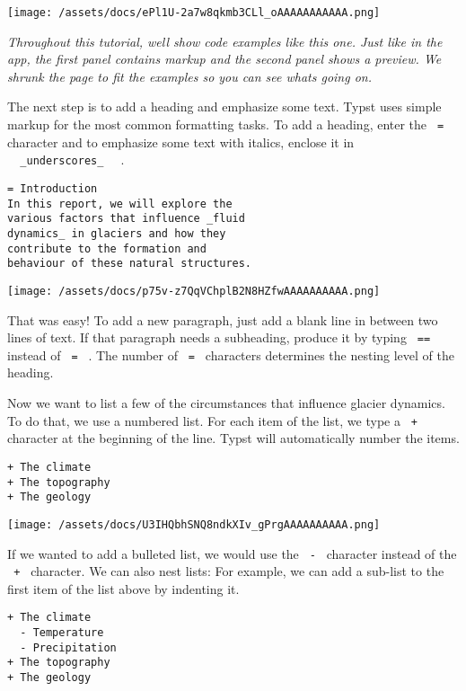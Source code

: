 \texttt{[image: /assets/docs/ePl1U-2a7w8qkmb3CLl\_oAAAAAAAAAAA.png]}

\emph{Throughout this tutorial, we\textquotesingle ll show code examples
like this one. Just like in the app, the first panel contains markup and
the second panel shows a preview. We shrunk the page to fit the examples
so you can see what\textquotesingle s going on.}

The next step is to add a heading and emphasize some text. Typst uses
simple markup for the most common formatting tasks. To add a heading,
enter the \texttt{\ =\ } character and to emphasize some text with
italics, enclose it in
\texttt{\ }{\texttt{\ \_underscores\_\ }}\texttt{\ } .

\begin{verbatim}
= Introduction
In this report, we will explore the
various factors that influence _fluid
dynamics_ in glaciers and how they
contribute to the formation and
behaviour of these natural structures.
\end{verbatim}

\texttt{[image: /assets/docs/p75v-z7QqVChplB2N8HZfwAAAAAAAAAA.png]}

That was easy! To add a new paragraph, just add a blank line in between
two lines of text. If that paragraph needs a subheading, produce it by
typing \texttt{\ ==\ } instead of \texttt{\ =\ } . The number of
\texttt{\ =\ } characters determines the nesting level of the heading.

Now we want to list a few of the circumstances that influence glacier
dynamics. To do that, we use a numbered list. For each item of the list,
we type a \texttt{\ +\ } character at the beginning of the line. Typst
will automatically number the items.

\begin{verbatim}
+ The climate
+ The topography
+ The geology
\end{verbatim}

\texttt{[image: /assets/docs/U3IHQbhSNQ8ndkXIv\_gPrgAAAAAAAAAA.png]}

If we wanted to add a bulleted list, we would use the \texttt{\ -\ }
character instead of the \texttt{\ +\ } character. We can also nest
lists: For example, we can add a sub-list to the first item of the list
above by indenting it.

\begin{verbatim}
+ The climate
  - Temperature
  - Precipitation
+ The topography
+ The geology
\end{verbatim}

